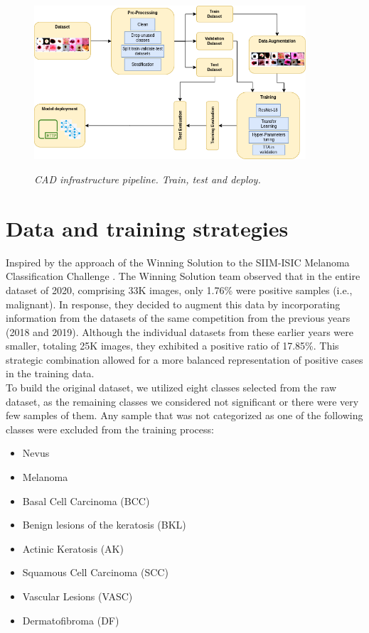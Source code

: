 \begin{figure}[H]
  \centering
  \includegraphics[width=0.9\textwidth]{imatges/methodological_contribution/Pipeline.drawio.png}
  \caption{\textit{CAD infrastructure pipeline. Train, test and deploy. }}
  {\label{fig:cad-pipeline}}
\end{figure}

\section{Data and training strategies}

Inspired by the approach of the Winning Solution to the SIIM-ISIC Melanoma
Classification Challenge \cite{WinningISIC}. The Winning Solution team observed
that in the entire dataset of 2020, comprising 33K images, only 1.76\% were
positive samples (i.e., malignant). In response, they decided to augment this
data by incorporating information from the datasets of the same competition
from the previous years (2018 and 2019). Although the individual datasets from
these earlier years were smaller, totaling 25K images, they exhibited a
positive ratio of 17.85\%. This strategic combination allowed for a more
balanced representation of positive cases in the training data. \\

To build the original dataset, we utilized eight classes selected from the raw
dataset, as the remaining classes we considered not significant or there were
very few samples of them. Any sample that was not categorized as one of the
following classes were excluded from the training process:

\begin{itemize}
  \item Nevus
  \item Melanoma
  \item Basal Cell Carcinoma (BCC)
  \item Benign lesions of the keratosis (BKL)
  \item Actinic Keratosis (AK)
  \item Squamous Cell Carcinoma (SCC)
  \item Vascular Lesions (VASC)
  \item Dermatofibroma (DF)
\end{itemize}

